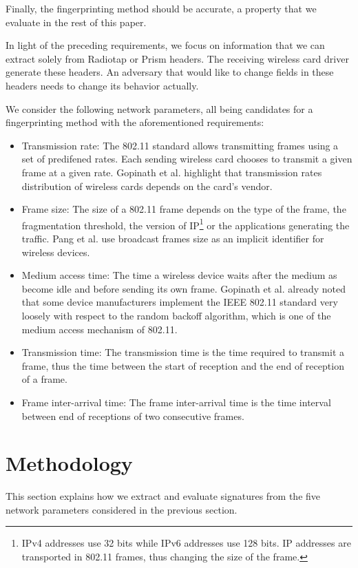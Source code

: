 \documentclass[10pt, conference, compsocconf, letterpaper]{IEEEtran}
\begin{document}
Finally, the fingerprinting method should be accurate, a property that we evaluate in the rest of this paper.


In light of the preceding requirements, we focus on information that we can extract solely from Radiotap \cite{radiotap.header} or Prism headers. 
The receiving wireless card driver generate these headers. An adversary that would like to change fields in these headers needs to change its behavior actually.

We consider the following network parameters, all being candidates for a fingerprinting method with the aforementioned requirements:
\begin{itemize}
\item{Transmission rate:} The 802.11 standard \cite{IEEE:80211} allows transmitting frames using a set of predifened rates. Each sending wireless card chooses to transmit a given frame at a given rate.
Gopinath et al. \cite{Gopinath:WiNTECH} highlight that transmission rates distribution of wireless cards depends on the card's vendor. 
\item{Frame size:} The size of a 802.11 frame depends on the type of the frame, the fragmentation threshold, the version of IP\footnote{IPv4 addresses use 32 bits while IPv6 addresses use 128 bits. IP addresses are transported in 802.11 frames, thus changing the size of the frame.} or the applications generating the traffic. Pang et al. \cite{Pang:Mobicom} use broadcast frames size as an implicit identifier for wireless devices.
\item{Medium access time:} 
The time a wireless device waits after the medium as become idle and before sending its own frame.
Gopinath et al. \cite{Gopinath:WiNTECH} already noted that some device manufacturers implement the IEEE 802.11 standard very loosely with respect to the random backoff algorithm, which is one of the medium access mechanism of 802.11.
\item{Transmission time:} The transmission time is the time required to transmit a frame, thus the time between the start of reception and the end of reception of a frame.
\item{Frame inter-arrival time:} The frame inter-arrival time is the time interval between end of receptions of two consecutive frames. 
\end{itemize}



\section{Methodology}
\label{sec:methodology}
This section explains how we extract and evaluate signatures from the five network parameters considered in the previous section.
\end{document}
